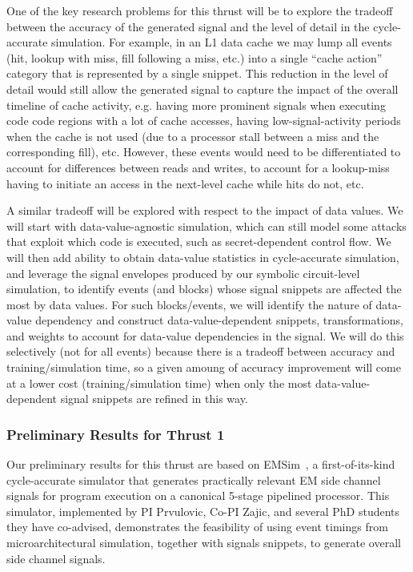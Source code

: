 One of the key research problems for this thrust will be to explore the tradeoff between the accuracy of the generated signal and the level of detail in the cycle-accurate simulation.
For example, in an L1 data cache we may lump all events (hit, lookup with miss, fill following a miss, etc.) into a single ``cache action''  category that is represented by a single snippet. This reduction in the level of detail would still allow the generated signal to capture the impact of the overall timeline of cache activity, e.g. having more prominent signals when executing code code regions with a lot of cache accesses, having low-signal-activity periods when the cache is not used (due to a processor stall between a miss and the corresponding fill), etc. However, these events would need to be differentiated to account for differences between reads and writes, to account for a lookup-miss having to initiate an access in the next-level cache while hits do not, etc.

A similar tradeoff will be explored with respect to the impact of data values.
We will start with data-value-agnostic simulation, which can still model some attacks
that exploit which code is executed, such as secret-dependent control flow.
We will then add ability to obtain data-value statistics in cycle-accurate simulation,
and leverage the signal envelopes produced by our symbolic circuit-level simulation, to identify events (and blocks) whose signal snippets are affected the most by data values.
For such blocks/events, we will identify the nature of data-value dependency and construct data-value-dependent snippets, transformations, and weights to account for data-value dependencies in the signal. We will do this selectively (not for all events) because there is a tradeoff between accuracy and training/simulation time, so a given amoung of accuracy improvement will come at a lower cost (training/simulation time) when only the most data-value-dependent signal snippets are refined in this way.

\subsubsection{Preliminary Results for Thrust 1}

Our preliminary results for this thrust are based on EMSim~\cite{Nader2020}, a first-of-its-kind cycle-accurate simulator that generates practically relevant EM side channel signals for program execution on a canonical 5-stage pipelined processor. This simulator,
implemented by PI Prvulovic, Co-PI Zajic, and several PhD students they have co-advised, demonstrates the feasibility of using event timings from microarchitectural simulation, together with signals snippets, to generate overall side channel signals.

